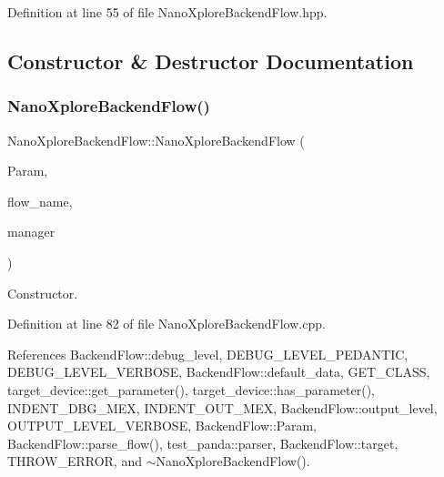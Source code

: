 Definition at line 55 of file Nano\+Xplore\+Backend\+Flow.\+hpp.



\subsection{Constructor \& Destructor Documentation}
\mbox{\label{classNanoXploreBackendFlow_aa2bfcacbbdd33d2ada15f5ad8d59f99e}} 
\subsubsection{\texorpdfstring{Nano\+Xplore\+Backend\+Flow()}{NanoXploreBackendFlow()}}
{\footnotesize\ttfamily Nano\+Xplore\+Backend\+Flow\+::\+Nano\+Xplore\+Backend\+Flow (\begin{DoxyParamCaption}\item[{const \hyperlink{Parameter_8hpp_a37841774a6fcb479b597fdf8955eb4ea}{Parameter\+Const\+Ref}}]{Param,  }\item[{const std\+::string \&}]{flow\+\_\+name,  }\item[{const \hyperlink{target__manager_8hpp_aee0b586a84fb6eb4faefa6e41e1735a9}{target\+\_\+manager\+Ref}}]{manager }\end{DoxyParamCaption})}



Constructor. 



Definition at line 82 of file Nano\+Xplore\+Backend\+Flow.\+cpp.



References Backend\+Flow\+::debug\+\_\+level, D\+E\+B\+U\+G\+\_\+\+L\+E\+V\+E\+L\+\_\+\+P\+E\+D\+A\+N\+T\+IC, D\+E\+B\+U\+G\+\_\+\+L\+E\+V\+E\+L\+\_\+\+V\+E\+R\+B\+O\+SE, Backend\+Flow\+::default\+\_\+data, G\+E\+T\+\_\+\+C\+L\+A\+SS, target\+\_\+device\+::get\+\_\+parameter(), target\+\_\+device\+::has\+\_\+parameter(), I\+N\+D\+E\+N\+T\+\_\+\+D\+B\+G\+\_\+\+M\+EX, I\+N\+D\+E\+N\+T\+\_\+\+O\+U\+T\+\_\+\+M\+EX, Backend\+Flow\+::output\+\_\+level, O\+U\+T\+P\+U\+T\+\_\+\+L\+E\+V\+E\+L\+\_\+\+V\+E\+R\+B\+O\+SE, Backend\+Flow\+::\+Param, Backend\+Flow\+::parse\+\_\+flow(), test\+\_\+panda\+::parser, Backend\+Flow\+::target, T\+H\+R\+O\+W\+\_\+\+E\+R\+R\+OR, and $\sim$\+Nano\+Xplore\+Backend\+Flow().

